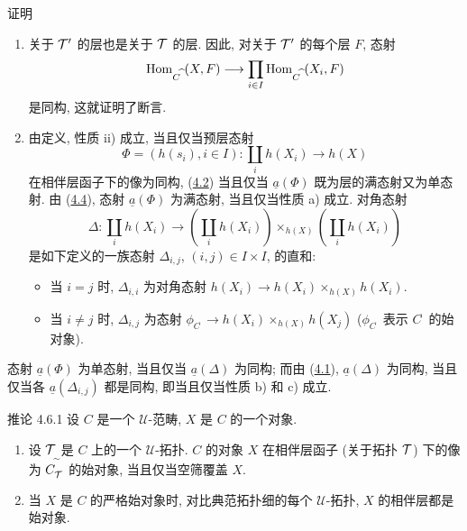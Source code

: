 \begin{enonce*}[remark]{证明}
\begin{enumerate}
\renewcommand{\labelenumi}{\theenumi)}
\item 关于 ${\mathcal T}'$ 的层也是关于 ${\mathcal T}$ 的层.
因此, 对关于 ${\mathcal T}'$ 的每个层 $F$, 态射
$$
\operatorname{Hom}_{C^{\widehat{\phantom{,}}}}(X,F)\longrightarrow \prod_{i\in I}
\operatorname{Hom}_{C^{\widehat{\phantom{,}}}}(X_i,F)
$$
是同构, 这就证明了断言.

\item 由定义, 性质 ii) 成立,
当且仅当预层态射
$$
\Phi=(h(s_i),i\in I):\coprod_i h(X_i)\longrightarrow h(X)
$$
在相伴层函子下的像为同构,
\ie (\hyperref[II.prop4.2]{4.2})
当且仅当 $\underline{a}(\Phi)$ 既为层的满态射又为单态射.
由 (\hyperref[II.theo4.4]{4.4}),
态射 $\underline{a}(\Phi)$ 为满态射, 当且仅当性质 a) 成立.
对角态射
$$
\Delta:\coprod_i h(X_i)\longrightarrow (\coprod_i
h(X_i))\times_{h(X)}(\coprod_i h(X_i))
$$
是如下定义的一族态射 $\Delta_{i,j}$, $(i,j)\in I\times I$, 的直和:
\begin{itemize}
\item[$\beta)$] 当 $i=j$ 时, $\Delta_{i,i}$ 为对角态射
$h(X_i)\rightarrow h(X_i)\times_{h(X)}h(X_i)$.

\item[$\gamma)$] 当 $i\neq j$ 时, $\Delta_{i,j}$ 为态射
$\phi_{C^{\widehat{\phantom{,}}}}\rightarrow
  h(X_i)\times_{h(X)}h(X_j)$
($\phi_{C^{\widehat{\phantom{,}}}}$ 表示 $C^{\widehat{\phantom{,}}}$ 的始对象).
\end{itemize}
\end{enumerate}
\end{enonce*}

态射\pageoriginale{} $\underline{a}(\Phi)$ 为单态射,
当且仅当 $\underline{a}(\Delta)$ 为同构;
而由 (\hyperref[II.theo4.1]{4.1}),
$\underline{a}(\Delta)$ 为同构,
当且仅当各 $\underline{a}(\Delta_{i,j})$ 都是同构,
即当且仅当性质 b) 和 c) 成立.

\begin{enonce*}{推论 4.6.1}
设 $C$ 是一个 $𝒰$-范畴, $X$ 是 $C$ 的一个对象.
\begin{enumerate}
\renewcommand{\labelenumi}{\theenumi)}
\item 设 ${\mathcal T}$ 是 $C$ 上的一个 $𝒰$-拓扑.
$C$ 的对象 $X$ 在相伴层函子 (关于拓扑 ${\mathcal T}$) 下的像
为 $C^{\widetilde{\phantom{,}}}_{{\mathcal T}}$ 的始对象,
当且仅当空筛覆盖 $X$.

\item 当 $X$ 是 $C$ 的严格始对象时,
对比典范拓扑细的每个 $𝒰$-拓扑, $X$ 的相伴层都是始对象.
\end{enumerate}
\end{enonce*}

